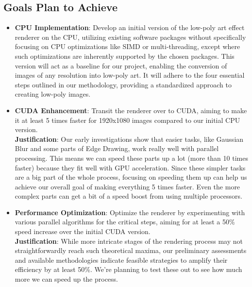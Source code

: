 \documentclass[12pt]{article}
\theoremstyle{definition}
\theoremstyle{plain}
\begin{document}
\subsection*{Goals Plan to Achieve}
\begin{itemize}
    \item \textbf{CPU Implementation}: Develop an initial version of the low-poly art effect renderer on the CPU, utilizing existing software packages without specifically focusing on CPU optimizations like SIMD or multi-threading, except where such optimizations are inherently supported by the chosen packages. This version will act as a baseline for our project, enabling the conversion of images of any resolution into low-poly art. It will adhere to the four essential steps outlined in our methodology, providing a standardized approach to creating low-poly images.
    
    \item \textbf{CUDA Enhancement}: Transit the renderer over to CUDA, aiming to make it at least 5 times faster for 1920x1080 images compared to our initial CPU version. \\[4pt]
    \textbf{Justification}: Our early investigations show that easier tasks, like Gaussian Blur and some parts of Edge Drawing, work really well with parallel processing. This means we can speed these parts up a lot (more than 10 times faster) because they fit well with GPU acceleration. Since these simpler tasks are a big part of the whole process, focusing on speeding them up can help us achieve our overall goal of making everything 5 times faster. Even the more complex parts can get a bit of a speed boost from using multiple processors.
    
    \item \textbf{Performance Optimization}: Optimize the renderer by experimenting with various parallel algorithms for the critical steps, aiming for at least a 50\% speed increase over the initial CUDA version. \\[4pt]
    \textbf{Justification}: While more intricate stages of the rendering process may not straightforwardly reach such theoretical maxima, our preliminary assessments and available methodologies indicate feasible strategies to amplify their efficiency by at least 50\%. We're planning to test these out to see how much more we can speed up the process.
\end{itemize}
\end{document}
